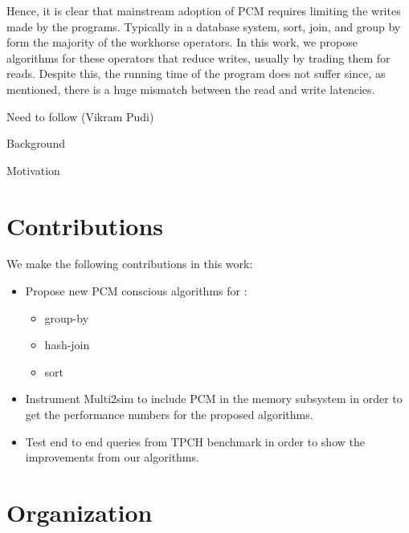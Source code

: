 Hence, it is clear that mainstream adoption of PCM requires limiting the writes made by the programs. Typically in a database system, sort, join, and group by form the majority of the workhorse operators. In this work, we propose algorithms for these operators that reduce writes, usually by trading them for reads. Despite this, the running time of the program does not suffer since, as mentioned, there is a huge mismatch between the read and write latencies.


Need to follow (Vikram Pudi)

Background

Motivation

\section{Contributions}
We make the following contributions in this work:
\begin{itemize}
\item Propose new PCM conscious algorithms for :
	\begin{itemize}
	\item 	group-by
	\item 	hash-join	
	\item  sort
	\end{itemize}	 
	
\item Instrument Multi2sim\cite{multi2sim} to include PCM in the memory subsystem in order to get the performance numbers for the proposed algorithms.
	
\item Test end to end queries from TPCH benchmark in order to show the improvements from our algorithms.

\end{itemize}
	
\section{Organization}
